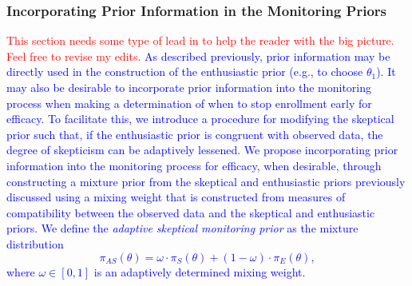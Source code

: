 \documentclass[useAMS,usenatbib,referee]{biom}
\begin{document}
\subsubsection{Incorporating Prior Information in the Monitoring Priors}\label{sec:incorporating}
\textcolor{red}{This section needs some type of lead in to help the reader with the big picture. Feel free to revise my edits.}
\textcolor{blue}{
%
As described previously, prior information may be directly used in the construction of the enthusiastic prior (e.g., to choose $\theta_1$).
It may also be desirable to incorporate prior information into the monitoring process when making a determination of when to stop enrollment 
early for efficacy. To facilitate this, we introduce a procedure for modifying the skeptical prior such that, if the enthusiastic prior is congruent 
with observed data, the degree of skepticism can be adaptively lessened.
We propose incorporating prior information into the monitoring process for efficacy, when desirable, through constructing a mixture prior
from the skeptical and enthusiastic priors previously discussed using a mixing weight that is constructed from measures of compatibility between the
observed data and the skeptical and enthusiastic priors. 
We define the \textit{adaptive skeptical monitoring prior} as the mixture distribution	
\begin{equation}\label{eq:inference_prior}
	\pi_{AS}\left(\theta\right)=\omega\cdot\pi_{S}\left(\theta\right)+(1-\omega) \cdot \pi_E\left(\theta\right),
\end{equation}
where $\omega\in[0,1]$ is an adaptively determined mixing weight. 
}
\end{document}
